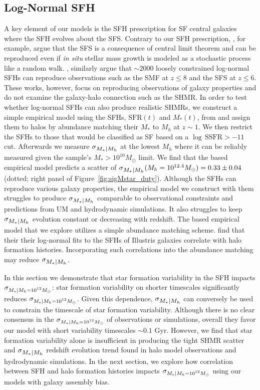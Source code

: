 \documentclass[12pt, letterpaper, preprint, tighten]{aastex62}
\newcommand{\siglogm}{\sigma_{\scaleto{M_*|M_h}{8pt}}}
\newcommand{\sigtwe}{\sigma_{\scaleto{M_*|M_h=10^{12}M_\odot}{8pt}}}
\begin{document}
\subsection{Log-Normal SFH}
A key element of our models is the SFH prescription for SF central galaxies where
the SFH evolves about the SFS. Contrary to our SFH prescription, \cite{kelson2014},
for example, argue that the SFS is a consequence of central limit theorem
and can be reproduced even if \emph{in situ} stellar mass growth is modeled as
a stochastic process like a random walk. \cite{gladders2013,abramson2015,abramson2016},
similarly argue that $\sim2000$ loosely constrained log-normal SFHs can reproduce
observations such as the SMF at $z \leq 8$ and the SFS at $z \leq 6$. These works,
however, focus on reproducing observations of galaxy properties and do not examine
the galaxy-halo connection such as the SHMR. In order to test whether log-normal
SFHs can also produce realistic SHMRs,
we construct a simple empirical model using  the SFHs, $\mathrm{SFR}(t)$ and
$M_*(t)$, from \cite{abramson2016} and assign them to halos by abundance matching
their $M_*$ to $M_h$ at $z{\sim}1$.
We then restrict the SFHs to those that would be classified as SF based
on a $\log\,\mathrm{SSFR} > -11$ cut. Afterwards we measure $\siglogm$
at the lowest $M_h$ where it can be reliably measured given the \cite{abramson2016}
sample's $M_*{>}10^{10}M_\odot$ limit.
We find that the \cite{abramson2016} based empirical model predicts a scatter
of $\siglogm(M_h=10^{12.4}M_\odot) = 0.33\pm0.04$ (dotted; right panel of Figure~\ref{fig:sigMstar_duty}).
Although the \cite{abramson2016} SFHs can reproduce various galaxy properties,
the empirical model we construct with them struggles to produce $\siglogm$ comparable 
to observational constraints and predictions from UM and hydrodynamic simulations.
It also struggles to keep $\siglogm$ evolution constant or decreasing with redshift. 
The \cite{abramson2016} based empirical model that we explore utilizes a simple
abundance matching scheme. \cite{diemer2017} find that their their log-normal fits
to the SFHs of Illustris galaxies correlate with halo formation histories. Incorporating
such correlations into the abundance matching may reduce $\siglogm$.

In this section we demonstrate that star formation variability in the SFH impacts
$\sigtwe$: star formation variability on shorter timescales significantly 
reduces $\sigtwe$. Given this dependence, $\siglogm$ can conversely be used to constrain
the timescale of star formation variability. Although there is no clear consensus in 
the $\sigtwe$ of observations or simulations, overall they favor our model with short 
variability timescales $\sim0.1$ Gyr. However, we find that star formation variability 
alone is insufficient in producing the tight SHMR scatter and $\siglogm$ redshift evolution 
trend found in halo model observations and hydrodynamic simulations. In the next section, 
we explore how correlation between SFH and halo formation histories impacts $\sigtwe$
using our models with galaxy assembly bias.
\end{document}
